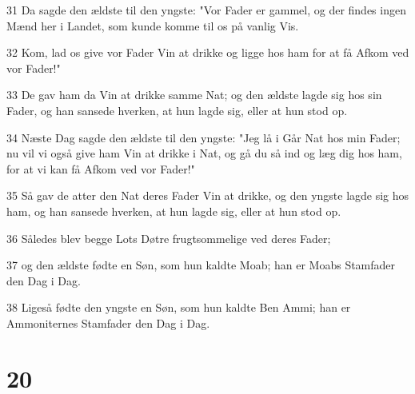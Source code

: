 \par 31 Da sagde den ældste til den yngste: "Vor Fader er gammel, og der findes ingen Mænd her i Landet, som kunde komme til os på vanlig Vis.
\par 32 Kom, lad os give vor Fader Vin at drikke og ligge hos ham for at få Afkom ved vor Fader!"
\par 33 De gav ham da Vin at drikke samme Nat; og den ældste lagde sig hos sin Fader, og han sansede hverken, at hun lagde sig, eller at hun stod op.
\par 34 Næste Dag sagde den ældste til den yngste: "Jeg lå i Går Nat hos min Fader; nu vil vi også give ham Vin at drikke i Nat, og gå du så ind og læg dig hos ham, for at vi kan få Afkom ved vor Fader!"
\par 35 Så gav de atter den Nat deres Fader Vin at drikke, og den yngste lagde sig hos ham, og han sansede hverken, at hun lagde sig, eller at hun stod op.
\par 36 Således blev begge Lots Døtre frugtsommelige ved deres Fader;
\par 37 og den ældste fødte en Søn, som hun kaldte Moab; han er Moabs Stamfader den Dag i Dag.
\par 38 Ligeså fødte den yngste en Søn, som hun kaldte Ben Ammi; han er Ammoniternes Stamfader den Dag i Dag.

\chapter{20}


